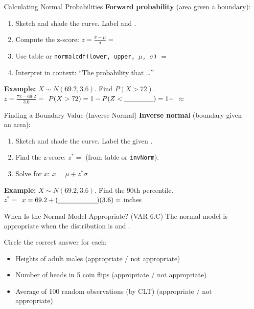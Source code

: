 \documentclass[10pt]{article}
\begin{document}
\vspace{0.1in}

\begin{notesbox}{Calculating Normal Probabilities}
\textbf{Forward probability} (area given a boundary):
\begin{enumerate}
  \item Sketch and shade the curve. Label \blank{3cm} and \blank{3cm}.
  \item Compute the z-score: $z = \frac{x - \mu}{\sigma} = $ \blank{4cm}
  \item Use table or \texttt{normalcdf(lower, upper, $\mu$, $\sigma$)} $=$ \blank{3cm}
  \item Interpret in context: ``The probability that \ldots'' \writeline
\end{enumerate}

\vspace{0.06in}
\textbf{Example:} $X \sim N(69.2, 3.6)$. Find $P(X > 72)$.\\[4pt]
$z = \frac{72 - 69.2}{3.6} = $ \blank{2.5cm} \qquad
$P(X > 72) = 1 - P(Z < \blank{1.5cm}) = 1 - $ \blank{2cm} $\approx$ \blank{2cm}
\end{notesbox}

\vspace{0.1in}

\begin{notesbox}{Finding a Boundary Value (Inverse Normal)}
\textbf{Inverse normal} (boundary given an area):
\begin{enumerate}
  \item Sketch and shade the curve. Label the given \blank{3cm}.
  \item Find the z-score: $z^* = $ \blank{3cm} (from table or \texttt{invNorm}).
  \item Solve for $x$: $x = \mu + z^*\sigma = $ \blank{6cm}
\end{enumerate}

\vspace{0.06in}
\textbf{Example:} $X \sim N(69.2, 3.6)$. Find the 90th percentile.\\[4pt]
$z^* = $ \blank{2.5cm} \qquad
$x = 69.2 + (\blank{2cm})(3.6) = $ \blank{3cm} inches
\end{notesbox}

\vspace{0.1in}

\begin{notesbox}{When Is the Normal Model Appropriate? (VAR-6.C)}
The normal model is appropriate when the distribution is \blank{6cm}
and \blank{8cm}.

Circle the correct answer for each:
\begin{itemize}
  \item Heights of adult males \hfill (appropriate / not appropriate)
  \item Number of heads in 5 coin flips \hfill (appropriate / not appropriate)
  \item Average of 100 random observations (by CLT) \hfill (appropriate / not appropriate)
\end{itemize}
\end{notesbox}
\end{document}
